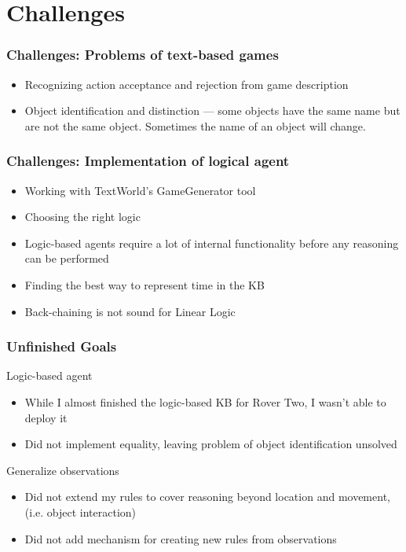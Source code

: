 \section{Challenges}

\begin{frame}
    \frametitle{Challenges: Problems of text-based games}

        \begin{itemize}
            \item Recognizing action acceptance and rejection from
                game description
            \item Object identification and distinction --- some objects
                have the same name but are not the same object.
                Sometimes the name of an object will change.
        \end{itemize}

\end{frame}

\begin{frame}
    \frametitle{Challenges: Implementation of logical agent}
    \begin{itemize}
        \item Working with TextWorld's GameGenerator tool
        \item Choosing the right logic
        \item Logic-based agents require a lot of internal functionality
            before any reasoning can be performed
        \item Finding the best way to represent time in the KB
        \item Back-chaining is not sound for Linear Logic
    \end{itemize}
\end{frame}

\begin{frame}
    \frametitle{Unfinished Goals}

    \begin{block}{Logic-based agent}
        \begin{itemize}
            \item While I almost finished the logic-based KB for Rover
                Two, I wasn't able to deploy it
            \item Did not implement equality, leaving problem of object
                identification unsolved
        \end{itemize}
    \end{block}

    \begin{block}{Generalize observations}
        \begin{itemize}
            \item Did not extend my rules to cover reasoning beyond
                location and movement, (i.e. object interaction)
            \item Did not add mechanism for creating new rules from
                observations
        \end{itemize}
    \end{block}

\end{frame}

